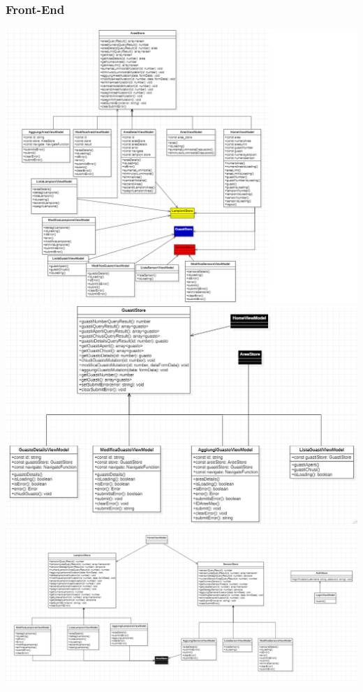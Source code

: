 \documentclass[12pt]{article}
\begin{document}
\subsubsection{Front-End}
\includegraphics[width=450pt]{Front-End.png}
\clearpage
\includegraphics[width=450pt]{Guasti.png}
\includegraphics[width=450pt]{Front-End2.png}
\clearpage
\end{document}
